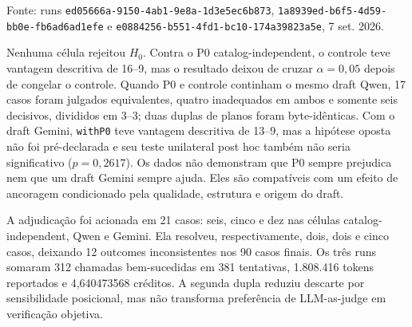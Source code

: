 \documentclass[12pt,a4paper]{article}
\begin{document}
\begin{table}[H]
\centering
\caption*{\textbf{Quadro 15 - Confirmação com controle congelado e três origens de P0}}
\scriptsize
\renewcommand{\arraystretch}{1.12}
\par\smallskip\raggedright\small Fonte: runs \texttt{ed05666a-9150-4ab1-9e8a-1d3e5ec6b873}, \texttt{1a8939ed-b6f5-4d59-bb0e-fb6ad6ad1efe} e \texttt{e0884256-b551-4fd1-bc10-174a39823a5e}, 7 set. 2026.
\end{table}

Nenhuma célula rejeitou \(H_0\). Contra o P0 catalog-independent, o controle teve vantagem descritiva de 16--9, mas o resultado deixou de cruzar \(\alpha=0{,}05\) depois de congelar o controle. Quando P0 e controle continham o mesmo draft Qwen, 17 casos foram julgados equivalentes, quatro inadequados em ambos e somente seis decisivos, divididos em 3--3; duas duplas de planos foram byte-idênticas. Com o draft Gemini, \texttt{withP0} teve vantagem descritiva de 13--9, mas a hipótese oposta não foi pré-declarada e seu teste unilateral post hoc também não seria significativo (\(p=0{,}2617\)). Os dados não demonstram que P0 sempre prejudica nem que um draft Gemini sempre ajuda. Eles são compatíveis com um efeito de ancoragem condicionado pela qualidade, estrutura e origem do draft.

A adjudicação foi acionada em 21 casos: seis, cinco e dez nas células catalog-independent, Qwen e Gemini. Ela resolveu, respectivamente, dois, dois e cinco casos, deixando 12 outcomes inconsistentes nos 90 casos finais. Os três runs somaram 312 chamadas bem-sucedidas em 381 tentativas, 1.808.416 tokens reportados e 4,640473568 créditos. A segunda dupla reduziu descarte por sensibilidade posicional, mas não transforma preferência de LLM-as-judge em verificação objetiva.
\end{document}
